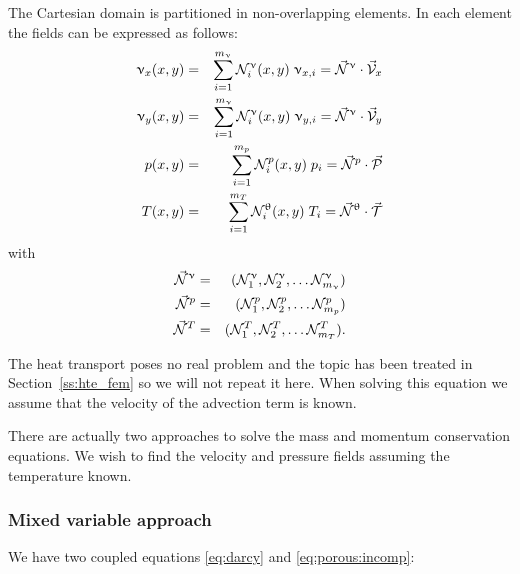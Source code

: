 The Cartesian domain is partitioned in non-overlapping elements. 
In each element the fields can be expressed as follows:
\begin{eqnarray}
\upnu_x(x,y) &=& \sum_{i=1}^{m_\upnu} {\mathcal{N}}_i^\upnu (x,y) \; \upnu_{x,i} = \vec{{\mathcal{N}}}^\upnu \cdot \vec{\cal V}_x \\
\upnu_y(x,y) &=& \sum_{i=1}^{m_\upnu} {\mathcal{N}}_i^\upnu (x,y) \; \upnu_{y,i} = \vec{{\mathcal{N}}}^\upnu \cdot \vec{\cal V}_y \\
p(x,y) &=& \sum_{i=1}^{m_p} {\mathcal{N}}_i^p(x,y) \; p_i 
= \vec{{\mathcal{N}}}^p \cdot \vec{\cal P} \\
T(x,y) &=& \sum_{i=1}^{m_T} {\mathcal{N}}_i^\uptheta (x,y) \; T_i
= \vec{{\mathcal{N}}}^\uptheta \cdot \vec{\cal T}
\end{eqnarray}
with
\begin{eqnarray}
\vec{{\mathcal{N}}}^\upnu &=& ({\mathcal{N}}^\upnu_1, {\mathcal{N}}^\upnu_2, \dots {\mathcal{N}}^\upnu_{m_\upnu}) \\
\vec{{\mathcal{N}}}^p &=& ({\mathcal{N}}^p_1, {\mathcal{N}}^p_2, \dots {\mathcal{N}}^p_{m_p}) \\
\vec{{\mathcal{N}}}^T &=& ({\mathcal{N}}^T_1, {\mathcal{N}}^T_2, \dots {\mathcal{N}}^T_{m_T}).
\end{eqnarray}

The heat transport poses no real problem and the topic has been treated in Section~\ref{ss:hte_fem} so we will not repeat it here. When solving this equation we assume that the velocity of the advection term is known.

There are actually two approaches to solve the mass and momentum conservation equations.
We wish to find the velocity and pressure fields assuming the temperature known. 

\subsubsection{Mixed variable approach}

We have two coupled equations \eqref{eq:darcy} and \eqref{eq:porous:incomp}:

